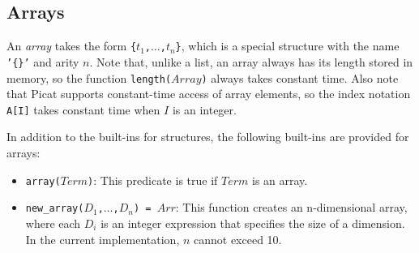 \subsection{\label{subsec:arrays}Arrays}
An \emph{array} takes the form \texttt{\{$t_1$,$\ldots$,$t_{n}$\}}, which is a special structure with the name \texttt{'\{\}'} and arity $n$. Note that, unlike a list, an array always has its length stored in memory, so the function \texttt{length($Array$)} always takes constant time. Also note that Picat supports constant-time access of array elements, so the index notation \texttt{A[I]} takes constant time when $I$ is an integer. 

In addition to the built-ins for structures, the following built-ins are provided for arrays:
\begin{itemize}
\item \texttt{array($Term$)}: This predicate is true if $Term$ is an array.
\item \texttt{new\_array($D_1$,$\ldots$,$D_n$) = $Arr$}: This function creates an n-dimensional array, where each $D_i$ is an integer expression that specifies the size of a dimension. In the current implementation, $n$ cannot exceed 10.
\end{itemize}

